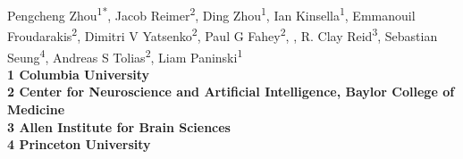 \documentclass[10pt,letterpaper]{article}
\begin{document}
\vspace*{0.35in}

\begin{flushleft}
{\Large
\textbf{}
}
\newline
Pengcheng Zhou\textsuperscript{1*}, 
Jacob Reimer\textsuperscript{2},
Ding Zhou\textsuperscript{1},
Ian Kinsella\textsuperscript{1},
Emmanouil Froudarakis\textsuperscript{2},
Dimitri V Yatsenko\textsuperscript{2},
Paul G Fahey\textsuperscript{2},
, R. Clay Reid\textsuperscript{3}, Sebastian Seung\textsuperscript{4},
Andreas S Tolias\textsuperscript{2},
Liam Paninski\textsuperscript{1}
 \\
 \bigskip
\bf{1} Columbia University \\
\bf{2} Center for Neuroscience and Artificial Intelligence, Baylor College of Medicine\\
\bf{3} Allen Institute for Brain Sciences \\
\bf{4} Princeton University \\
\bigskip
\end{flushleft}
\end{document}
